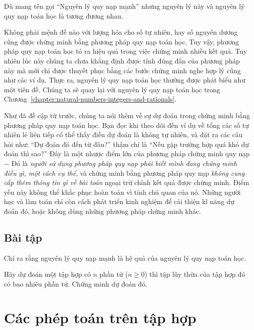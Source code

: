 Dù mang tên gọi ``Nguyên lý quy nạp mạnh'' nhưng nguyên lý này và nguyên lý quy nạp toán học là tương đương nhau.

Không phải mệnh đề nào với lượng hóa cho số tự nhiên, hay số nguyên dương cũng được chứng minh bằng phương pháp quy nạp toán học.  Tuy vậy, phương pháp quy nạp toán học tỏ ra hiệu quả trong việc chứng minh nhiều kết quả. Tuy nhiên lúc này chúng ta chưa khẳng định được tính đúng đắn của phương pháp này mà mới chỉ được thuyết phục bằng các bước chứng minh nghe hợp lý cũng như các ví dụ. Thực ra, nguyên lý quy nạp toán học thường được phát biểu như một tiên đề. Chúng ta sẽ quay lại với nguyên lý quy nạp toán học trong Chương~\ref{chapter:natural-numbers-integers-and-rationals}.

Như đã đề cập từ trước, chúng ta nói thêm về sự dự đoán trong chứng minh bằng phương pháp quy nạp toán học. Bạn đọc khi theo dõi đến ví dụ về tổng các số tự nhiên lẻ liên tiếp có thể thấy điều dự đoán là không tự nhiên, và đặt ra các câu hỏi như: ``Dự đoán đó đến từ đâu?\@'' thậm chí là ``Nếu gặp trường hợp quá khó dự đoán thì sao?\@'' Đây là một nhược điểm lớn của phương pháp chứng minh quy nạp $-$ Đó là \textit{người sử dụng phương pháp quy nạp phải biết mình đang chứng minh điều gì, một cách cụ thể}, và chứng minh bằng phương pháp quy nạp \textit{không cung cấp thêm thông tin gì về bài toán} ngoại trừ chính kết quả được chứng minh. Điểm yếu này không thể khắc phục hoàn toàn vì tính chủ quan của nó. Những người học và làm toán chỉ còn cách phát triển kinh nghiệm để cải thiện kĩ năng dự đoán đó, hoặc không dùng những phương pháp chứng minh khác.

\subsection*{Bài tập}
\setcounter{exercise}{0}

\begin{exercise}
    Chỉ ra rằng nguyên lý quy nạp mạnh là hệ quả của nguyên lý quy nạp toán học.
\end{exercise}

\begin{exercise}
    Hãy dự đoán một tập hợp có $n$ phần tử ($n\geq 0$) thì tập lũy thừa của tập hợp đó có bao nhiêu phần tử. Chứng minh dự đoán đó.
\end{exercise}

\section{Các phép toán trên tập hợp}

